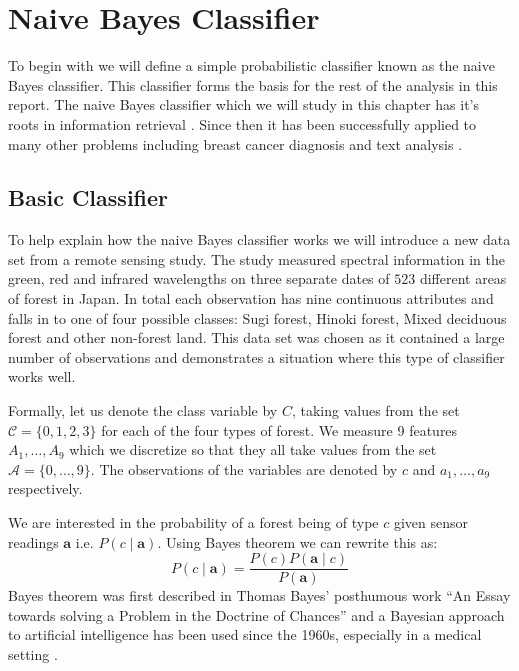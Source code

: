 \chapter{Naive Bayes Classifier}

To begin with we will define a simple probabilistic classifier known as the naive Bayes classifier.
This classifier forms the basis for the rest of the analysis in this report.
The naive Bayes classifier which we will study in this chapter has it's roots in information retrieval \cite{Lewis98}.
Since then it has been successfully applied to many other problems including breast cancer diagnosis \cite{Dumitru09} and text analysis \cite{Nigam98}.


\section{Basic Classifier}

To help explain how the naive Bayes classifier works we will introduce a new data set from a remote sensing study.
The study measured spectral information in the green, red and infrared wavelengths on three separate dates of $523$ different areas of forest in Japan.
In total each observation has nine continuous attributes and falls in to one of four possible classes: Sugi forest, Hinoki forest, Mixed deciduous forest and other non-forest land.
This data set was chosen as it contained a large number of observations and demonstrates a situation where this type of classifier works well.

Formally, let us denote the class variable by $C$, taking values from the set $\mathcal{C} = \{0,1,2,3\}$ for each of the four types of forest.
We measure 9 features $A_1,\dots,A_9$ which we discretize so that they all take values from the set $\mathcal{A} = \{0,\dots,9\}$.
The observations of the variables are denoted by $c$ and $a_1,\dots,a_9$ respectively.

We are interested in the probability of a forest being of type $c$ given sensor readings $\mathbf{a}$ i.e. $P(c \mid \mathbf{a})$.
Using Bayes theorem we can rewrite this as:
\begin{equation} \label{bayes}
	P(c \mid \mathbf{a}) = \frac{P(c)P(\mathbf{a} \mid c)}{P(\mathbf{a})}
\end{equation}
Bayes theorem was first described in Thomas Bayes' posthumous work ``An Essay towards solving a Problem in the Doctrine of Chances'' \cite{Bayes63} and a Bayesian approach to artificial intelligence has been used since the 1960s, especially in a medical setting \cite{Russell03}.

